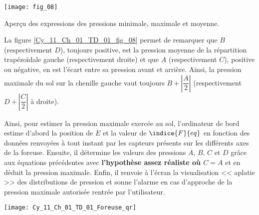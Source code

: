 
\begin{marginfigure}
\centering
\texttt{[image: fig\_08]}
\caption{ Aperçu des expressions des pressions 
minimale, maximale et moyenne. \label{Cy_11_Ch_01_TD_01_fig_08}}
\end{marginfigure}
La figure \ref{Cy_11_Ch_01_TD_01_fig_08} permet de remarquer que $B$ 
(respectivement $D$), toujours positive, est la 
pression moyenne de la répartition 
trapézoïdale gauche (respectivement droite) 
et que $A$ (respectivement $C$), positive ou 
négative, en est l’écart entre sa pression 
avant et arrière. Ainsi, la pression maximale 
du sol sur la chenille gauche vaut toujours 
$B+\left|\dfrac{A}{2}\right|$ (respectivement  $D+\left|\dfrac{C}{2}\right|$ à droite).

Ainsi, pour estimer la pression maximale exercée au sol, l’ordinateur de bord estime d’abord la 
position de $E$ et la valeur de $\indice{F}{eq}$ en fonction des données renvoyées à tout instant par les capteurs présents sur les différents axes de la foreuse. Ensuite, il détermine les valeurs des pressions $A$, $B$, $C$ et $D$ grâce aux équations précédentes avec \textbf{l’hypothèse assez réaliste où $C = A$} et en déduit la pression maximale. Enfin, il renvoie à l’écran la visualisation << aplatie >> des distributions de pression et sonne l’alarme en cas d’approche de la pression maximale autorisée rentrée par l’utilisateur. 

\ifprof
\else
\begin{marginfigure}
\centering
\texttt{[image: Cy\_11\_Ch\_01\_TD\_01\_Foreuse\_qr]}
\end{marginfigure}
\fi




